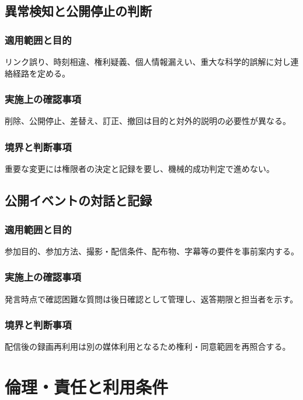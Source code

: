 \documentclass[a4paper,11pt]{article}
\begin{document}
\subsection{異常検知と公開停止の判断}
\subsubsection{適用範囲と目的}
\par リンク誤り、時刻相違、権利疑義、個人情報漏えい、重大な科学的誤解に対し連絡経路を定める。\par\medskip
\subsubsection{実施上の確認事項}
\par 削除、公開停止、差替え、訂正、撤回は目的と対外的説明の必要性が異なる。\par\medskip
\subsubsection{境界と判断事項}
\par 重要な変更には権限者の決定と記録を要し、機械的成功判定で進めない。\par\medskip
\subsection{公開イベントの対話と記録}
\subsubsection{適用範囲と目的}
\par 参加目的、参加方法、撮影・配信条件、配布物、字幕等の要件を事前案内する。\par\medskip
\subsubsection{実施上の確認事項}
\par 発言時点で確認困難な質問は後日確認として管理し、返答期限と担当者を示す。\par\medskip
\subsubsection{境界と判断事項}
\par 配信後の録画再利用は別の媒体利用となるため権利・同意範囲を再照合する。\par\medskip
\section{倫理・責任と利用条件}
\end{document}
